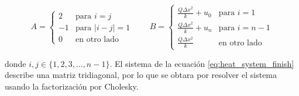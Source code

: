 \begin{equation}
    A =
    \begin{cases}
        2  & \text{para }          i=j     \\
        -1 & \text{para }          |i-j|=1 \\
        0  & \text{en otro lado}
    \end{cases}
    \qquad
    B = \begin{cases}
        \frac{Q\Delta x^2}{k}+u_0 & \text{para } i=1    \\
        \frac{Q\Delta x^2}{k}+u_n & \text{para } i=n-1  \\
        \frac{Q\Delta x^2}{k}     & \text{en otro lado}
    \end{cases}
    \label{eq:heat_system_finish}
\end{equation}

donde $i,j \in\{1,2,3,\dots,n-1\}$. El sistema de la ecuación \ref{eq:heat_system_finish} describe una matriz tridiagonal, por lo que se obtara por resolver el sistema usando la factorización por Cholesky.